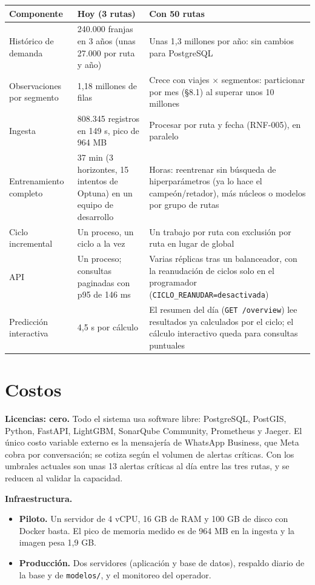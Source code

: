 \documentclass[11pt,a4paper]{article}
\newcommand{\cod}[1]{\texttt{\small #1}}
\begin{document}
\begin{table}[h]
\centering\small
\begin{tabularx}{\textwidth}{@{}lYY@{}}
\toprule
\textbf{Componente} & \textbf{Hoy (3 rutas)} & \textbf{Con 50 rutas} \\
\midrule
Histórico de demanda & 240.000 franjas en 3 años (unas 27.000 por ruta y año) & Unas 1,3 millones por año: sin cambios para PostgreSQL \\
Observaciones por segmento & 1,18 millones de filas & Crece con viajes $\times$ segmentos: particionar por mes (§8.1) al superar unos 10 millones \\
Ingesta & 808.345 registros en 149 s, pico de 964 MB & Procesar por ruta y fecha (RNF-005), en paralelo \\
Entrenamiento completo & 37 min (3 horizontes, 15 intentos de Optuna) en un equipo de desarrollo & Horas: reentrenar sin búsqueda de hiperparámetros (ya lo hace el campeón/retador), más núcleos o modelos por grupo de rutas \\
Ciclo incremental & Un proceso, un ciclo a la vez & Un trabajo por ruta con exclusión por ruta en lugar de global \\
API & Un proceso; consultas paginadas con p95 de 146 ms & Varias réplicas tras un balanceador, con la reanudación de ciclos solo en el programador (\cod{CICLO\_REANUDAR=desactivada}) \\
Predicción interactiva & 4,5 s por cálculo & El resumen del día (\cod{GET /overview}) lee resultados ya calculados por el ciclo; el cálculo interactivo queda para consultas puntuales \\
\bottomrule
\end{tabularx}
\end{table}

\section{Costos}

\textbf{Licencias: cero.} Todo el sistema usa software libre: PostgreSQL, PostGIS, Python, FastAPI, LightGBM, SonarQube Community, Prometheus y Jaeger. El único costo variable externo es la mensajería de WhatsApp Business, que Meta cobra por conversación; se cotiza según el volumen de alertas críticas. Con los umbrales actuales son unas 13 alertas críticas al día entre las tres rutas, y se reducen al validar la capacidad.

\textbf{Infraestructura.}

\begin{itemize}
  \setlength{\itemsep}{0.1em}
  \item \textbf{Piloto.} Un servidor de 4 vCPU, 16 GB de RAM y 100 GB de disco con Docker basta. El pico de memoria medido es de 964 MB en la ingesta y la imagen pesa 1,9 GB.
  \item \textbf{Producción.} Dos servidores (aplicación y base de datos), respaldo diario de la base y de \cod{modelos/}, y el monitoreo del operador.
\end{itemize}
\end{document}
